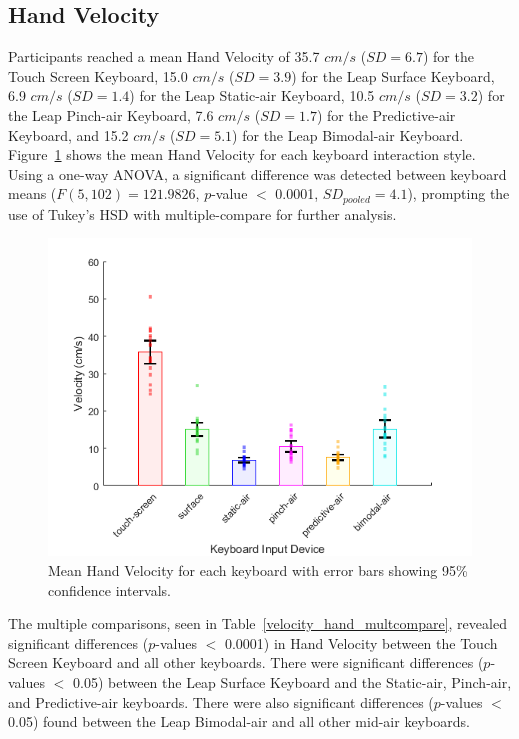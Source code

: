 \subsection{Hand Velocity}
Participants reached a mean Hand Velocity of 35.7 $cm/s$ ($SD = 6.7$) for the Touch Screen Keyboard, 15.0 $cm/s$ ($SD = 3.9$) for the Leap Surface Keyboard, 6.9 $cm/s$ ($SD = 1.4$) for the Leap Static-air Keyboard, 10.5 $cm/s$ ($SD = 3.2$) for the Leap Pinch-air Keyboard, 7.6 $cm/s$ ($SD = 1.7$) for the Predictive-air Keyboard, and 15.2 $cm/s$ ($SD = 5.1$) for the Leap Bimodal-air Keyboard. Figure~\ref{fig_velocity_hand_mean} shows the mean Hand Velocity for each keyboard interaction style. Using a one-way ANOVA, a significant difference was detected between keyboard means ($F(5, 102) = 121.9826$, $p$-value $<$ 0.0001, $SD_{pooled} = 4.1$), prompting the use of Tukey's HSD with multiple-compare for further analysis.

\begin{figure}[!t]
	\centering
	\includegraphics{Figures/fig_velocity_hand_mean}
	\caption[Mean Hand Velocity]{Mean Hand Velocity for each keyboard with error bars showing 95\% confidence intervals.}
	\label{fig_velocity_hand_mean}
\end{figure}

The multiple comparisons, seen in Table~\ref{velocity_hand_multcompare}, revealed significant differences ($p$-values $<$ 0.0001) in Hand Velocity between the Touch Screen Keyboard and all other keyboards. There were significant differences ($p$-values $<$ 0.05) between the Leap Surface Keyboard and the Static-air, Pinch-air, and Predictive-air keyboards. There were also significant differences ($p$-values $<$ 0.05) found between the Leap Bimodal-air and all other mid-air keyboards.

